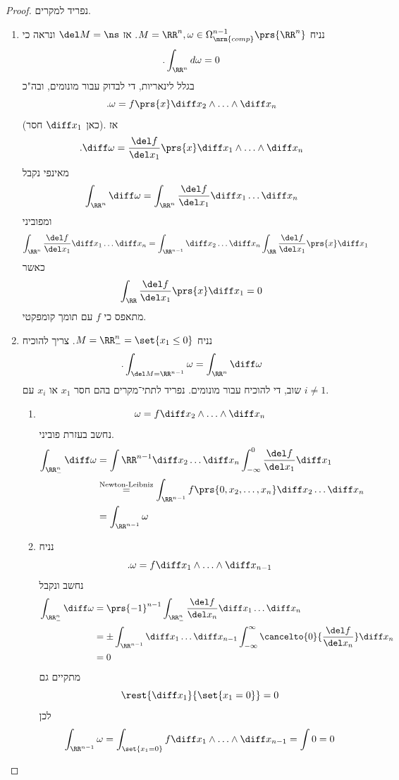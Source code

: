 \documentclass[a4paper,10pt,twoside,openany]{book}
\begin{document}
\begin{proof}
נפריד למקרים.
\begin{enumerate}[label = מקרה \Roman* :]
\item
נניח
$M = \RR^n, \omega \in \Omega^{n-1}_{\mrm{comp}}\prs{\RR^n}$.
אז
$\del M = \ns$
ונראה כי
\[\text{.} \int_{\RR^n} d\omega = 0\]
בגלל לינאריות, די לבדוק עבור מונומים, ובה"כ
\[\text{.}\omega = f\prs{x} \diff x_2 \wedge \ldots \wedge \diff x_n\]
(כאן
$\diff x_1$
חסר).
אז
\[\text{.} \diff \omega = \frac{\del f}{\del x_1} \prs{x} \diff x_1 \wedge \ldots \wedge \diff x_n\]
מאינפי נקבל
\[\int_{\RR^n} \diff \omega  =\int_{\RR^n} \frac{\del f}{\del x_1} \diff x_1 \ldots \diff x_n\]
ומפוביני
\begin{align*}
\int_{\RR^n} \frac{\del f}{\del x_1} \diff x_1 \ldots \diff x_n &= \int_{\RR^{n-1}} \diff x_2 \ldots \diff x_n \int_{\RR} \frac{\del f}{\del x_1} \prs{x} \diff x_1
\end{align*}
כאשר
\[\int_{\RR} \frac{\del f}{\del x_1} \prs{x} \diff x_1 = 0\]
מתאפס כי
$f$
עם תומך קומפקטי.
\item
נניח
$M = \RR^n_- = \set{x_1 \leq 0}$.
צריך להוכיח
\[\text{.} \int_{\del M = \RR^{n-1}} \omega = \int_{\RR^n} \diff \omega\]
שוב, די להוכיח עבור מונומים.
נפריד לתתי־מקרים בהם חסר
$x_1$
או
$x_i$
עם
$i \neq 1$.
\begin{enumerate}[label = (\arabic*)]
\item \[\omega = f \diff x_2 \wedge \ldots \wedge \diff x_n\]
נחשב בעזרת פוביני.
\begin{align*}
\int_{\RR^n_{-}} \diff \omega &= \int{\RR^{n-1}} \diff x_2 \ldots \diff x_n \int_{-\infty}^0 \frac{\del f}{\del x_1} \diff x_1 \\&\stackrel{\text{Newton-Leibniz}}{=} \int_{\RR^{n-1}} f\prs{0,x_2, \ldots, x_n} \diff x_2 \ldots \diff x_n \\&= \int_{\RR^{n-1}} \omega
\end{align*}
\item
נניח
\[ \text{.} \omega = f\diff x_1 \wedge \ldots \wedge \diff x_{n-1}\]
נחשב ונקבל
\begin{align*}
\int_{\RR^n_-} \diff \omega &= \prs{-1}^{n-1} \int_{\RR^n_-} \frac{\del f}{\del x_n} \diff x_1 \ldots \diff x_n \\&= \pm \int_{\RR^{n-1}} \diff x_1 \ldots \diff x_{n-1} \int_{-\infty}^{\infty} \cancelto{0}{\frac{\del f}{\del x_n}} \diff x_n \\&= 0
\end{align*}
מתקיים גם
\[\rest{\diff x_1}{\set{x_1 = 0}} = 0\]
לכן
\[\int_{\RR^{n-1}} \omega = \int_{\set{x_1 = 0}} f \diff x_1 \wedge \ldots \wedge \diff x_{n-1} = \int 0 = 0\]

\end{enumerate}
\end{enumerate}
\end{proof}
\end{document}

